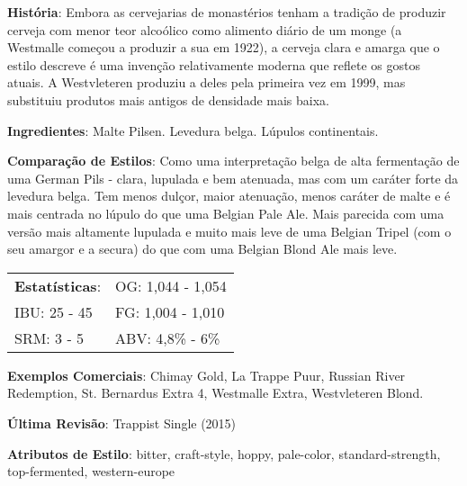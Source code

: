 \textbf{História}: Embora as cervejarias de monastérios tenham a tradição de produzir cerveja com menor teor alcoólico como alimento diário de um monge (a Westmalle começou a produzir a sua em 1922), a cerveja clara e amarga que o estilo descreve é uma invenção relativamente moderna que reflete os gostos atuais. A Westvleteren produziu a deles pela primeira vez em 1999, mas substituiu produtos mais antigos de densidade mais baixa.

\textbf{Ingredientes}: Malte Pilsen. Levedura belga. Lúpulos continentais.

\textbf{Comparação de Estilos}: Como uma interpretação belga de alta fermentação de uma German Pils - clara, lupulada e bem atenuada, mas com um caráter forte da levedura belga. Tem menos dulçor, maior atenuação, menos caráter de malte e é mais centrada no lúpulo do que uma Belgian Pale Ale. Mais parecida com uma versão mais altamente lupulada e muito mais leve de uma Belgian Tripel (com o seu amargor e a secura) do que com uma Belgian Blond Ale mais leve.

\begin{tabular}{@{}p{35mm}p{35mm}@{}}
  \textbf{Estatísticas}: & OG: 1,044 - 1,054 \\
  IBU: 25 - 45  & FG: 1,004 - 1,010  \\
  SRM: 3 - 5  & ABV: 4,8\% - 6\%
\end{tabular}

\textbf{Exemplos Comerciais}: Chimay Gold, La Trappe Puur, Russian River Redemption, St. Bernardus Extra 4, Westmalle Extra, Westvleteren Blond.

\textbf{Última Revisão}: Trappist Single (2015)

\textbf{Atributos de Estilo}: bitter, craft-style, hoppy, pale-color, standard-strength, top-fermented, western-europe

